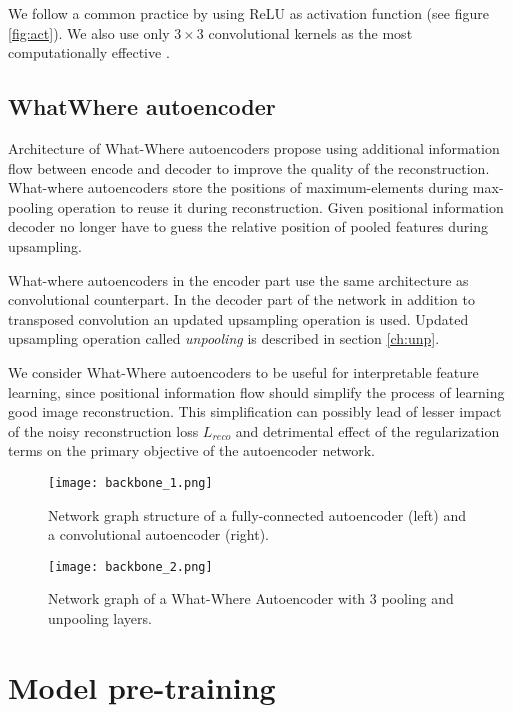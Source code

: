 We follow a common practice by using ReLU as activation function (see figure \ref{fig:act}).
We also use only $3 \times 3$ convolutional kernels as the most computationally effective \cite{Szegedy2016a}.

\subsection{WhatWhere autoencoder}

Architecture of What-Where autoencoders \cite{Zhao2015} propose using additional information flow between encode and decoder to improve the quality of the reconstruction.
What-where autoencoders store the positions of maximum-elements during max-pooling operation to reuse it during reconstruction.
Given positional information decoder no longer have to guess the relative position of pooled features during upsampling.

What-where autoencoders in the encoder part use the same architecture as convolutional counterpart.
In the decoder part of the network in addition to transposed convolution an updated upsampling operation is used.
Updated upsampling operation called \textit{unpooling} is described in section \ref{ch:unp}.

We consider What-Where autoencoders to be useful for interpretable feature learning, since positional information flow should simplify the process of learning good image reconstruction.
This simplification can possibly lead of lesser impact of the noisy reconstruction loss $L_{reco}$ and detrimental effect of the regularization terms on the primary objective of the autoencoder network.

\begin{figure}[H]
  \centering
  \texttt{[image: backbone\_1.png]}
  \caption{Network graph structure of a fully-connected autoencoder (left) and a convolutional autoencoder (right).}
  \label{fig:tf_graph_1}
\end{figure}
\begin{figure}[H]
  \centering
    \texttt{[image: backbone\_2.png]}
  \caption{Network graph of a What-Where Autoencoder with 3 pooling and unpooling layers.}
  \label{fig:tf_graph_2}
\end{figure}

\section{Model pre-training}

